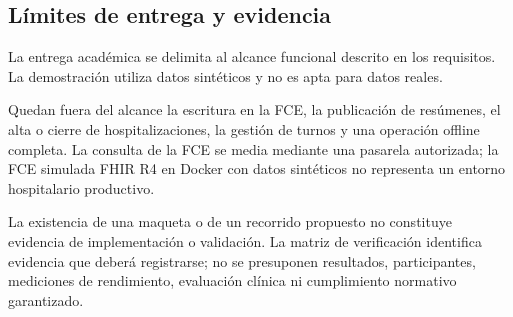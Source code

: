 \subsection{Límites de entrega y evidencia}

La entrega académica se delimita al alcance funcional descrito en los requisitos. La demostración utiliza datos sintéticos y no es apta para datos reales.

Quedan fuera del alcance la escritura en la FCE, la publicación de resúmenes, el alta o cierre de hospitalizaciones, la gestión de turnos y una operación offline completa. La consulta de la FCE se media mediante una pasarela autorizada; la FCE simulada FHIR R4 en Docker con datos sintéticos no representa un entorno hospitalario productivo.

La existencia de una maqueta o de un recorrido propuesto no constituye evidencia de implementación o validación. La matriz de verificación identifica evidencia que deberá registrarse; no se presuponen resultados, participantes, mediciones de rendimiento, evaluación clínica ni cumplimiento normativo garantizado.
